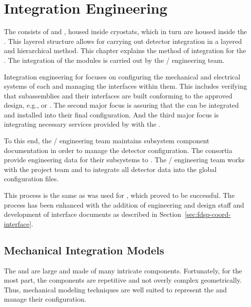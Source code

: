 \chapter{Integration Engineering}
\label{sec:fdsp-coord-integ-sysengr}

The   consists of  and
, housed inside cryostats, which in turn are housed
inside the  .  This layered structure allows
for carrying out detector integration in a layered and hierarchical
method.  This chapter explains the method of integration for the
.  The integration of the modules is carried out by
the / engineering team.

Integration engineering for  focuses on configuring the
mechanical and electrical systems of each  and managing
the interfaces within them. This includes verifying that subassemblies
and their interfaces are built conforming to the approved design,
e.g.,  or  . The second major focus
is assuring that the  can be integrated and
installed into their final configuration. And the third major focus is
integrating necessary services provided by  
with the .


To this end, the / engineering team maintains
subsystem component documentation in order to manage the detector
configuration. The consortia provide engineering data for their
subsystems to . The / engineering team
works with the  project team and  to integrate
all detector data into the global  configuration files.

This process is the same as was used for , which proved to be
successful. The process has been enhanced with the addition of engineering
and design staff and development of interface documents as described
in Section~\ref{sec:fdsp-coord-interface}.

\section{Mechanical Integration Models}
\label{sec:fdsp-coord-integ-models}

The  and   are large and made of many
intricate components. Fortunately, for the most part, the
components are repetitive and not overly complex
geometrically. Thus, \threed mechanical modeling techniques are well suited
to represent the  and manage their configuration.

